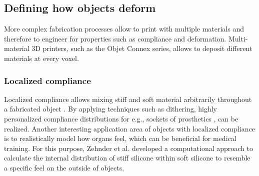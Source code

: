 \subsection{Defining how objects deform}

More complex fabrication processes allow to print with multiple materials and therefore to engineer for properties such as compliance and deformation. Multi-material 3D printers, such as the Objet Connex series, allows to deposit different materials at every voxel. 

\subsubsection{Localized compliance}
Localized compliance allows mixing stiff and soft material arbitrarily throughout a fabricated object \cite{Kou2007}. By applying techniques such as dithering, highly personalized compliance distributions for e.g., sockets of prosthetics \cite{Doubrovski2015}, can be realized. Another interesting application area of objects with localized compliance is to realistically model how organs feel, which can be beneficial for medical training. For this purpose, Zehnder et al. \cite{Zehnder2017} developed a computational approach to calculate the internal distribution of stiff silicone within soft silicone to resemble a specific feel on the outside of objects.



